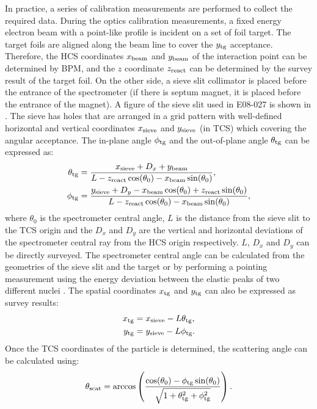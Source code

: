 In practice, a series of calibration measurements are performed to collect the required data. During the optics calibration measurements, a fixed energy electron beam with a point-like profile is incident on a set of foil target. The target foils are aligned along the beam line to cover the $y_{\mathrm{tg}}$ acceptance. Therefore, the HCS coordinates $x_{\mathrm{beam}}$ and $y_{\mathrm{beam}}$ of the interaction point can be determined by BPM, and the $z$ coordinate $z_{\mathrm{react}}$ can be determined by the survey result of the target foil. On the other side, a sieve slit collimator is placed before the entrance of the spectrometer (if there is septum magnet, it is placed before the entrance of the magnet). A figure of the sieve slit used in E08-027 is shown in . The sieve has holes that are arranged in a grid pattern with well-defined horizontal and vertical coordinates $x_{\mathrm{sieve}}$ and $y_{\mathrm{sieve}}$ (in TCS) which covering the angular acceptance. The in-plane angle $\phi_{\mathrm{tg}}$ and the out-of-plane angle $\theta_{\mathrm{tg}}$ can be expressed as:
\begin{align} \label{C6S2E5}
\theta_{\mathrm{tg}} & = \frac{x_{\mathrm{sieve}}+D_x+y_{\mathrm{beam}}}{L-z_{\mathrm{react}}\cos(\theta_0)-x_{\mathrm{beam}}\sin(\theta_0)}, \\ \label{C6S2E6}
\phi_{\mathrm{tg}} & = \frac{y_{\mathrm{sieve}}+D_y-x_{\mathrm{beam}}\cos(\theta_0)+z_{\mathrm{react}}\sin(\theta_0)}{L-z_{\mathrm{react}}\cos(\theta_0)-x_{\mathrm{beam}}\sin(\theta_0)},
\end{align}
where $\theta_0$ is the spectrometer central angle, $L$ is the distance from the sieve slit to the TCS origin and the $D_x$ and $D_y$ are the vertical and horizontal deviations of the spectrometer central ray from the HCS origin respectively. $L$, $D_x$ and $D_y$ can be directly surveyed. The spectrometer central angle can be calculated from the geometries of the sieve slit and the target or by performing a pointing measurement using the energy deviation between the elastic peaks of two different nuclei \cite{Liyanage2011}. The spatial coordinates $x_{\mathrm{tg}}$ and $y_{\mathrm{tg}}$ can also be expressed as survey results:
\begin{align} \label{C6S2E7}
x_{\mathrm{tg}} & = x_{\mathrm{sieve}}-L\theta_{\mathrm{tg}}, \\ \label{C6S2E8}
y_{\mathrm{tg}} & = y_{\mathrm{sieve}}-L\phi_{\mathrm{tg}}.
\end{align}
Once the TCS coordinates of the particle is determined, the scattering angle can be calculated using:
\begin{equation} \label{C6S2E9}
\theta_{\mathrm{scat}} = \arccos\left(\frac{\cos(\theta_0)-\phi_{\mathrm{tg}}\sin(\theta_0)}{\sqrt{1+\theta_{\mathrm{tg}}^2+\phi_{\mathrm{tg}}^2}}\right).
\end{equation}
